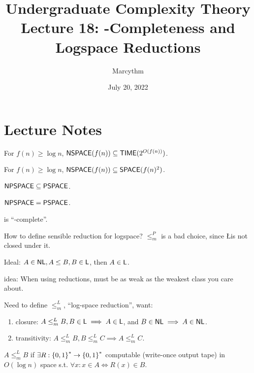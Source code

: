\documentclass{article}
\title{Undergraduate Complexity Theory \\ Lecture 18: \NL-Completeness and Logspace Reductions}
\author{Marcythm}
\date{July 20, 2022}
\begin{document}
\maketitle{}

\section{Lecture Notes}

\begin{theorem}
  For \(f(n) \geq \log n\), \( \text{\sf NSPACE}(f(n)) \subseteq \text{\sf TIME}(2^{O(f(n))}) \).
\end{theorem}

\begin{theorem}
  For \(f(n) \geq \log n\), \( \text{\sf NSPACE}(f(n)) \subseteq \text{\sf SPACE}(f(n)^2) \).
\end{theorem}

\begin{corollary}
  \( \text{\sf NPSPACE} \subseteq \text{\sf PSPACE} \).
\end{corollary}

\begin{corollary}
  \( \text{\sf NPSPACE} = \text{\sf PSPACE} \).
\end{corollary}

\begin{claim}
   is ``\NL-complete''.
\end{claim}

How to define sensible reduction for logspace? \(\leq_m^P\) is a bad choice, since \L is not closed under it.

Ideal: \(A \in \text{\sf NL}, A \leq B, B \in \text{\sf L}\), then \(A \in \text{\sf L}\).

idea: When using reductions, must be as weak as the weakest class you care about.

Need to define \(\leq_m^L\), ``log-space reduction'', want:

\begin{enumerate}
  \item closure: \(A \leq_m^L B, B \in \text{\sf L} \implies A \in \text{\sf L}\), and \(B \in \text{\sf NL} \implies A \in \text{\sf NL}\).
  \item transitivity: \(A \leq_m^L B, B \leq_m^L C \implies A \leq_m^L C\).
\end{enumerate}

\begin{definition}
  \(A \leq_m^L B\) if \(\exists R: \left\lbrace 0, 1 \right\rbrace^* \to \left\lbrace 0, 1 \right\rbrace^*\) computable (write-once output tape) in \(O(\log n)\) space s.t. \(\forall x: x \in A \iff R(x) \in B\).
\end{definition}
\end{document}
